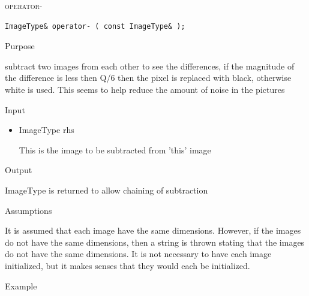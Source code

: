 \documentclass[pdftex, 11pt]{article}
\begin{document}
\begin{description}
\begin{description}
		\end{description}


	\item{\textsc{operator-}}
		\begin{description}

\begin{lstlisting}
ImageType& operator- ( const ImageType& );
\end{lstlisting}

			\item{Purpose}

				subtract two images from each other to see the 
				differences, if the magnitude of
				the difference is less then Q/6 then the pixel
				is replaced with black,	otherwise white is used. 
				This seems to help reduce 
				the amount of noise in the pictures

			\item{Input}

				\begin{itemize}

					\item{ImageType rhs}

						This is the image to be subtracted from
						'this' image

				\end{itemize}

			\item{Output}

				ImageType is returned to allow chaining of subtraction

			\item{Assumptions}

				It is assumed that each image have the same dimensions.
				However, if the images do not have the same dimensions,
				then a string is thrown stating that the images do
				not have the same dimensions. It is not necessary to have
				each image initialized, but it makes senses
				that they would each be initialized.

			\item{Example}


\end{description}
\end{description}
\end{document}
